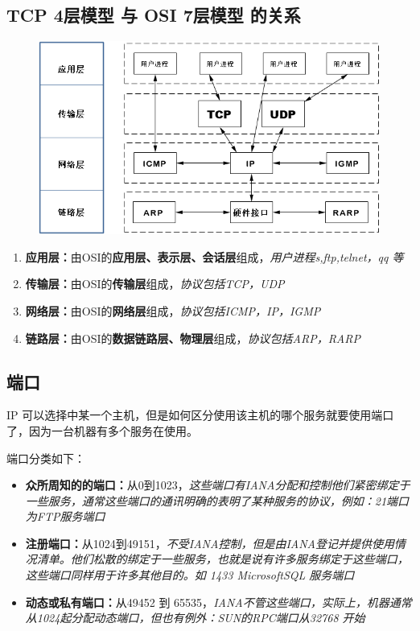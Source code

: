 \documentclass[UTF8,a4paper,8pt]{ctexbook}
\begin{document}
		\subsection{TCP 4层模型 与 OSI 7层模型 的关系}
			\begin{figure}[h]
				\centering
				\includegraphics[scale = 0.8]{TCP-4.png}
			\end{figure}
			 \begin{enumerate}
			 	\item \textbf{应用层：}由OSI的\textbf{应用层、表示层、会话层}组成，\textit{用户进程s,ftp,telnet，qq 等}
			 	\item \textbf{传输层：}由OSI的\textbf{传输层}组成，\textit{协议包括TCP，UDP}
			 	\item \textbf{网络层：}由OSI的\textbf{网络层}组成，\textit{协议包括ICMP，IP，IGMP}
			 	\item \textbf{链路层：}由OSI的\textbf{数据链路层、物理层}组成，\textit{协议包括ARP，RARP}
			 \end{enumerate}
			
		\subsection{端口}
				IP 可以选择中某一个主机，但是如何区分使用该主机的哪个服务就要使用端口了，因为一台机器有多个服务在使用。
				
				端口分类如下：
				\begin{itemize}
					\item \textbf{众所周知的的端口：}从0到1023，\textit{这些端口有IANA分配和控制他们紧密绑定于一些服务，通常这些端口的通讯明确的表明了某种服务的协议，例如：21端口为FTP服务端口}
					\item \textbf{注册端口：}从1024到49151，\textit{不受IANA控制，但是由IANA登记并提供使用情况清单。他们松散的绑定于一些服务，也就是说有许多服务绑定于这些端口，这些端口同样用于许多其他目的。如 1433 MicrosoftSQL 服务端口}
					\item \textbf{动态或私有端口：}从49452 到 65535，\textit{IANA不管这些端口，实际上，机器通常从1024起分配动态端口，但也有例外：SUN的RPC端口从32768 开始}
				\end{itemize}
	
\end{document}
